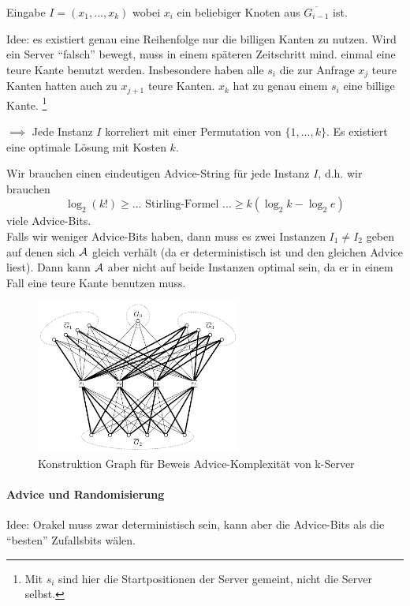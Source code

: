 Eingabe $I = (x_1, ..., x_k)$ wobei $x_i$ ein beliebiger Knoten aus $\overline{G_{i-1}}$ ist.

Idee: es existiert genau eine Reihenfolge nur die billigen Kanten zu nutzen. Wird ein Server
``falsch'' bewegt, muss in einem späteren Zeitschritt mind. einmal eine teure Kante benutzt werden.
Insbesondere haben alle $s_i$ die zur Anfrage $x_j$ teure Kanten hatten auch zu $x_{j+1}$ teure Kanten.
$x_k$ hat zu genau einem $s_i$ eine billige Kante.
\footnote{Mit $s_i$ sind hier die Startpositionen der Server gemeint, nicht die Server selbst.}

$\implies$ Jede Instanz $I$ korreliert mit einer Permutation von $\{1, ..., k\}$.
Es existiert eine optimale Lösung mit Kosten $k$.

Wir brauchen einen eindeutigen Advice-String für jede Instanz $I$, d.h. wir brauchen
$$ \log_2 (k!) \geq ... \text{ Stirling-Formel } ... \geq k (\log_2 k - \log_2 e) $$
viele Advice-Bits.
\\
Falls wir weniger Advice-Bits haben, dann muss es zwei Instanzen $I_1 \neq I_2$ geben auf denen sich
$\mathcal{A}$ gleich verhält (da er deterministisch ist und den gleichen Advice liest).
Dann kann $\mathcal{A}$ aber nicht auf beide Instanzen optimal sein, da er in einem Fall eine teure Kante benutzen muss.

\begin{figure}[h]
    \centering
    \includegraphics[width=0.6\textwidth]{images/k-server-advice.png}
    \caption{Konstruktion Graph für Beweis Advice-Komplexität von k-Server}
    \label{k-server-advice}
\end{figure}

\paragraph{Advice und Randomisierung}
Idee: Orakel muss zwar deterministisch sein, kann aber die Advice-Bits als die ``besten''
Zufallsbits wälen.

